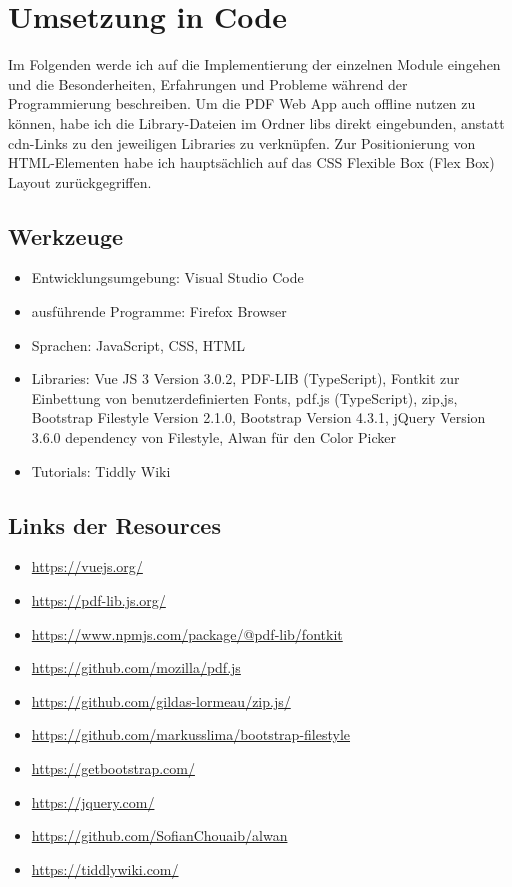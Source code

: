 \section{Umsetzung in Code}
Im Folgenden werde ich auf die Implementierung der einzelnen Module eingehen und die Besonderheiten, Erfahrungen und Probleme während der Programmierung beschreiben. Um die PDF Web App auch offline nutzen zu können, habe ich die Library-Dateien im Ordner libs direkt eingebunden, anstatt \gls{cdn}-Links zu den jeweiligen Libraries zu verknüpfen. Zur Positionierung von HTML-Elementen habe ich hauptsächlich auf das CSS Flexible Box (Flex Box) Layout zurückgegriffen. 

\subsection{Werkzeuge}
\begin{itemize}
	\item Entwicklungsumgebung: Visual Studio Code
	\item ausführende Programme: Firefox Browser
	\item Sprachen: JavaScript, CSS, HTML
	\item Libraries: Vue JS 3 Version 3.0.2, PDF-LIB (TypeScript), Fontkit zur Einbettung von benutzerdefinierten Fonts, pdf.js (TypeScript), zip,js, Bootstrap Filestyle Version 2.1.0, Bootstrap Version 4.3.1, jQuery Version 3.6.0 dependency von Filestyle, Alwan für den Color Picker
	\item Tutorials: Tiddly Wiki
\end{itemize}

\subsection{Links der Resources}
\begin{itemize}
	\item \url{https://vuejs.org/}
	\item \url{https://pdf-lib.js.org/}
	\item \url{https://www.npmjs.com/package/@pdf-lib/fontkit}
	\item \url{https://github.com/mozilla/pdf.js}
	\item \url{https://github.com/gildas-lormeau/zip.js/}
	\item \url{https://github.com/markusslima/bootstrap-filestyle}
	\item \url{https://getbootstrap.com/}
	\item \url{https://jquery.com/}
	\item \url{https://github.com/SofianChouaib/alwan}
	\item \url{https://tiddlywiki.com/}
\end{itemize}

